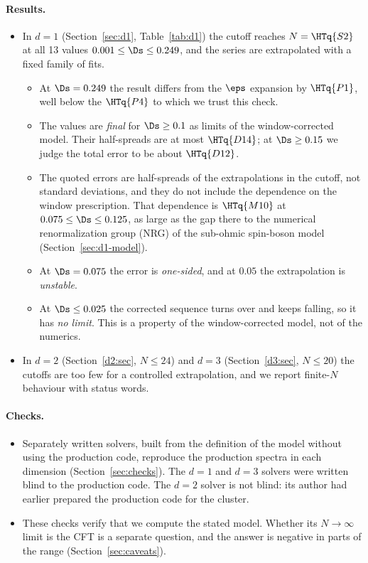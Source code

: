 \paragraph{Results.}
\begin{itemize}
\item In $d=1$ (Section~\ref{sec:d1}, Table~\ref{tab:d1}) the cutoff reaches $N=\HTq{S2}$ at all 13 values
 $0.001\le\Ds\le0.249$, and the series are extrapolated with a fixed family of fits.
 \begin{itemize}
 \item At $\Ds=0.249$ the result differs from the $\eps$ expansion by $\HTq{P1}$, well below the $\HTq{P4}$ to
 which we trust this check.
 \item The values are \emph{final} for $\Ds\geq0.1$ as limits of the window-corrected model. Their half-spreads
 are at most $\HTq{D14}$; at $\Ds\ge0.15$ we judge the total error to be about $\HTq{D12}$.
 \item The quoted errors are half-spreads of the extrapolations in the cutoff, not standard deviations, and they do
 not include the dependence on the window prescription. That dependence is $\HTq{M10}$ at $0.075\le\Ds\le0.125$,
 as large as the gap there to the numerical renormalization group (NRG) of the sub-ohmic spin-boson
 model~\cite{Bulla:2003rns,Bulla:2005bnrg} (Section~\ref{sec:d1-model}).
 \item At $\Ds=0.075$ the error is \emph{one-sided}, and at $0.05$ the extrapolation is \emph{unstable}.
 \item At $\Ds\le0.025$ the corrected sequence turns over and keeps falling, so it has \emph{no limit}. This is a
 property of the window-corrected model, not of the numerics.
 \end{itemize}
\item In $d=2$ (Section~\ref{d2:sec}, $N\le24$) and $d=3$ (Section~\ref{d3:sec}, $N\le20$) the cutoffs are too few
 for a controlled extrapolation, and we report finite-$N$ behaviour with status words.
\end{itemize}

\paragraph{Checks.}
\begin{itemize}
\item Separately written solvers, built from the definition of the model without using the production code, reproduce
 the production spectra in each dimension (Section~\ref{sec:checks}). The $d=1$ and $d=3$ solvers were written blind
 to the production code. The $d=2$ solver is not blind: its author had earlier prepared the production code for the
 cluster.
\item These checks verify that we compute the stated model. Whether its $N\to\infty$ limit is the CFT is a separate
 question, and the answer is negative in parts of the range (Section~\ref{sec:caveats}).
\end{itemize}

